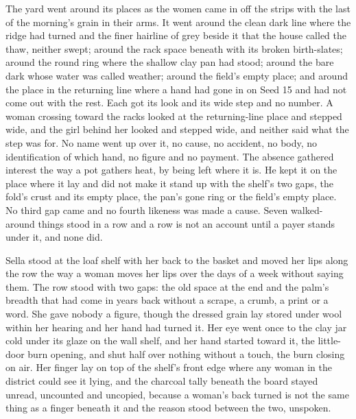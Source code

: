 The yard went around its places as the women came in off the strips with the last of the morning's grain in their arms. It went around the clean dark line where the  ridge had turned and the finer hairline of grey beside it that the house called the thaw, neither swept; around the rack space beneath  with its broken birth-slates; around the round ring where the shallow clay pan had stood; around the bare dark  whose water was called weather; around the field's empty place; and around the place in the returning line where a hand had gone in on Seed 15 and had not come out with the rest. Each got its look and its wide step and no number. A woman crossing toward the racks looked at the returning-line place and stepped wide, and the girl behind her looked and stepped wide, and neither said what the step was for. No name went up over it, no cause, no accident, no body, no identification of which hand, no figure and no payment. The absence gathered interest the way a pot gathers heat, by being left where it is. He kept it on the place where it lay and did not make it stand up with the shelf's two gaps, the fold's crust and its empty place, the pan's gone ring or the field's empty place. No third gap came and no fourth likeness was made a cause. Seven walked-around things stood in a row and a row is not an account until a payer stands under it, and none did.

\scenebreak

Sella stood at the loaf shelf with her back to the basket and moved her lips along the row the way a woman moves her lips over the days of a week without saying them. The row stood with two gaps: the old space at the end and the palm's breadth that had come in years back without a scrape, a crumb, a print or a word. She gave nobody a figure, though the dressed grain lay stored under wool within her hearing and her hand had turned it. Her eye went once to the clay jar cold under its glaze on the wall shelf, and her hand started toward it, the little-door burn opening, and shut half over nothing without a touch, the burn closing on air. Her finger lay on top of the shelf's front edge where any woman in the district could see it lying, and the charcoal tally beneath the board stayed unread, uncounted and uncopied, because a woman's back turned is not the same thing as a finger beneath it and the reason stood between the two, unspoken.

